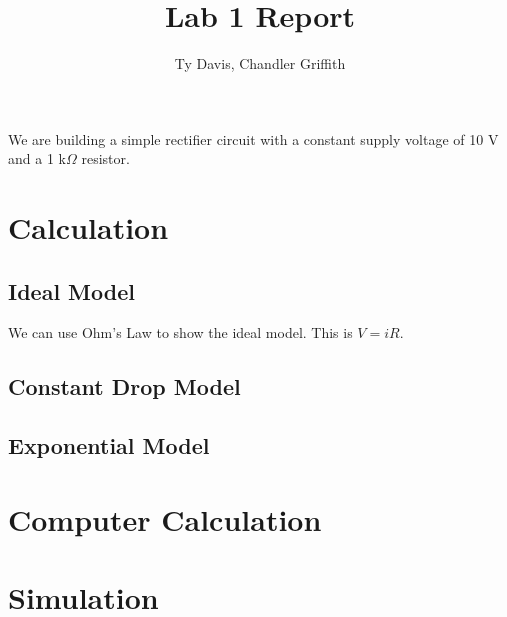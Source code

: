 \documentclass{article}
\title{Lab 1 Report}
\author{Ty Davis, Chandler Griffith}
\begin{document}
\maketitle
We are building a simple rectifier circuit with a constant supply
voltage of 10 V and a 1 k$\Omega$ resistor.

\section{Calculation}
\subsection{Ideal Model}
We can use Ohm's Law to show the ideal model. This is $V=iR$.

\subsection{Constant Drop Model}

\subsection{Exponential Model}

\section{Computer Calculation}

\section{Simulation}
\end{document}
